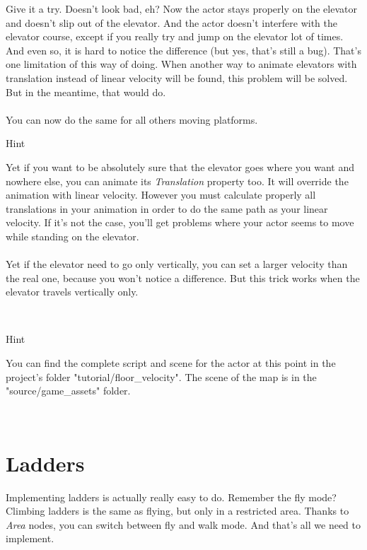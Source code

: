 \documentclass[10pt,a4paper]{article}
\newenvironment{hint}{%
\begin{bclogo}[logo=\bcinfo, couleurBarre=Green, noborder=true, 
               couleur=white]{Hint}
}{%
\end{bclogo}\hspace{1px}\\
}
\begin{document}
Give it a try. Doesn't look bad, eh? Now the actor stays properly on the elevator and doesn't slip out of the elevator. And the actor doesn't interfere with the elevator course, except if you really try and jump on the elevator lot of times. And even so, it is hard to notice the difference (but yes, that's still a bug). That's one limitation of this way of doing. When another way to animate elevators with translation instead of linear velocity will be found, this problem will be solved. But in the meantime, that would do.\\
\\
You can now do the same for all others moving platforms.

\begin{hint}
Yet if you want to be absolutely sure that the elevator goes where you want and nowhere else, you can animate its \textit{Translation} property too. It will override the animation with linear velocity. However you must calculate properly all translations in your animation in order to do the same path as your linear velocity. If it's not the case, you'll get problems where your actor seems to move while standing on the elevator. \\
\\
Yet if the elevator need to go only vertically, you can set a larger velocity than the real one, because you won't notice a difference. But this trick works when the elevator travels vertically only.
\end{hint}

\begin{hint}
You can find the complete script and scene for the actor at this point in the project's folder "tutorial/floor\_velocity". The scene of the map is in the "source/game\_assets" folder.
\end{hint}

\section{Ladders}
Implementing ladders is actually really easy to do. Remember the fly mode? Climbing ladders is the same as flying, but only in a restricted area. Thanks to \textit{Area} nodes, you can switch between fly and walk mode. And that's all we need to implement.
\end{document}

